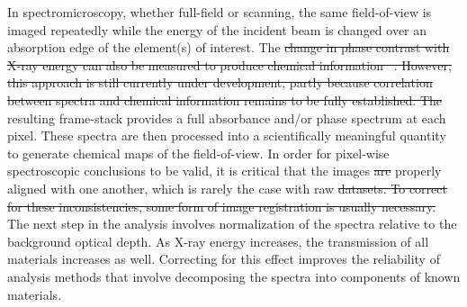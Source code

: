 \documentclass[journal=cmatex,manuscript=perspective]{achemso}
\providecommand{\DIFaddtex}[1]{{\protect\color{blue}\uwave{#1}}} %
\providecommand{\DIFdeltex}[1]{{\protect\color{red}\sout{#1}}}                      %
\providecommand{\DIFaddbegin}{} %
\providecommand{\DIFaddend}{} %
\providecommand{\DIFdelbegin}{} %
\providecommand{\DIFdelend}{} %
\providecommand{\DIFadd}[1]{\texorpdfstring{\DIFaddtex{#1}}{#1}} %
\providecommand{\DIFdel}[1]{\texorpdfstring{\DIFdeltex{#1}}{}} %
\begin{document}
In spectromicroscopy, whether full-field or scanning, the same
field-of-view is imaged repeatedly while the energy of the incident
beam is changed over an absorption edge of the element(s) of
interest. The \DIFdelbegin \DIFdel{change in phase contrast with X-ray energy can also be
measured to produce chemical information\mbox{%
\cite{takahashi2011}}%
. However,
this approach is still currently under development, partly because
correlation between spectra and chemical information remains to be
fully established. The }\DIFdelend resulting frame-stack provides a full absorbance and/or
phase spectrum at each pixel. These spectra are then processed into a
scientifically meaningful quantity to generate chemical maps of the
field-of-view. In order for pixel-wise spectroscopic conclusions to be
valid, it is critical that the images \DIFdelbegin \DIFdel{are }\DIFdelend \DIFaddbegin \DIFadd{be }\DIFaddend properly aligned with one
another, which is rarely the case with raw \DIFdelbegin \DIFdel{datasets.  To correct for these inconsistencies, some form of image
registration is usually necessary. }\DIFdelend \DIFaddbegin \DIFadd{data-sets.  }\DIFaddend The next step
in the analysis involves normalization of the spectra relative to the
background optical depth. As X-ray energy increases, the transmission
of all materials increases as well. Correcting for this effect
improves the reliability of analysis methods that involve decomposing
the spectra into components of known materials\cite{jin2015}.
\DIFaddbegin 
\end{document}
